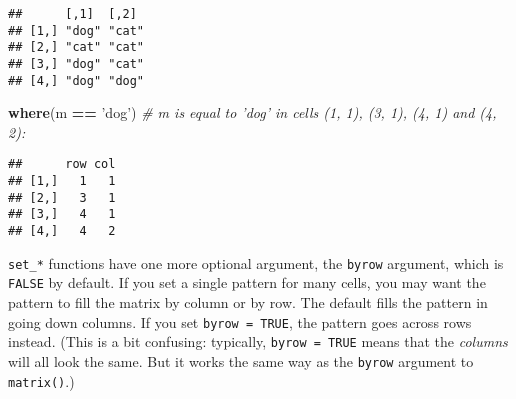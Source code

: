\documentclass[]{article}
\newenvironment{Shaded}{\begin{snugshade}}{\end{snugshade}}
\newcommand{\KeywordTok}[1]{\textcolor[rgb]{0.13,0.29,0.53}{\textbf{#1}}}
\newcommand{\DataTypeTok}[1]{\textcolor[rgb]{0.13,0.29,0.53}{#1}}
\newcommand{\DecValTok}[1]{\textcolor[rgb]{0.00,0.00,0.81}{#1}}
\newcommand{\StringTok}[1]{\textcolor[rgb]{0.31,0.60,0.02}{#1}}
\newcommand{\CommentTok}[1]{\textcolor[rgb]{0.56,0.35,0.01}{\textit{#1}}}
\newcommand{\OtherTok}[1]{\textcolor[rgb]{0.56,0.35,0.01}{#1}}
\newcommand{\OperatorTok}[1]{\textcolor[rgb]{0.81,0.36,0.00}{\textbf{#1}}}
\newcommand{\NormalTok}[1]{#1}
\begin{document}
\begin{verbatim}
##      [,1]  [,2] 
## [1,] "dog" "cat"
## [2,] "cat" "cat"
## [3,] "dog" "cat"
## [4,] "dog" "dog"
\end{verbatim}

\begin{Shaded}
\begin{Highlighting}[]
\KeywordTok{where}\NormalTok{(m }\OperatorTok{==}\StringTok{ 'dog'}\NormalTok{) }\CommentTok{# m is equal to 'dog' in cells (1, 1), (3, 1), (4, 1) and (4, 2):}
\end{Highlighting}
\end{Shaded}

\begin{verbatim}
##      row col
## [1,]   1   1
## [2,]   3   1
## [3,]   4   1
## [4,]   4   2
\end{verbatim}

\FloatBarrier

\texttt{set\_*} functions have one more optional argument, the
\texttt{byrow} argument, which is \texttt{FALSE} by default. If you set
a single pattern for many cells, you may want the pattern to fill the
matrix by column or by row. The default fills the pattern in going down
columns. If you set \texttt{byrow\ =\ TRUE}, the pattern goes across
rows instead. (This is a bit confusing: typically,
\texttt{byrow\ =\ TRUE} means that the \emph{columns} will all look the
same. But it works the same way as the \texttt{byrow} argument to
\texttt{matrix()}.)

\begin{Shaded}
\end{Shaded}
\end{document}
